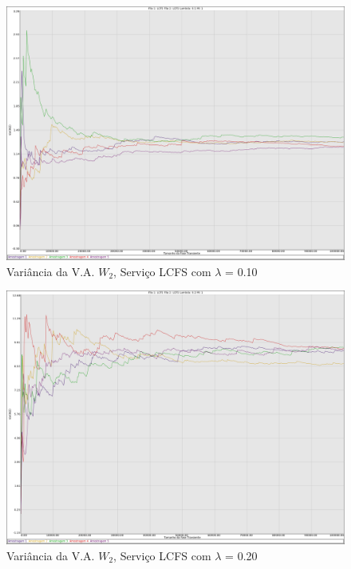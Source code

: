 \documentclass[a4paper,10pt]{article}
\begin{document}
\begin{figure}
	\caption{Variância da V.A. $W_2$, Serviço LCFS com $\lambda$ = 0.10}
	\label{figTransienteLCFSfila2VarWLambda010}
	\includegraphics[scale = 0.20]{./graficos_transiente_2/05.png}
\end{figure}

\begin{figure}
	\caption{Variância da V.A. $W_2$, Serviço LCFS com $\lambda$ = 0.20}
	\label{figTransienteLCFSfila2VarWLambda020}
	\includegraphics[scale = 0.20]{./graficos_transiente_2/06.png}
\end{figure}
\end{document}
